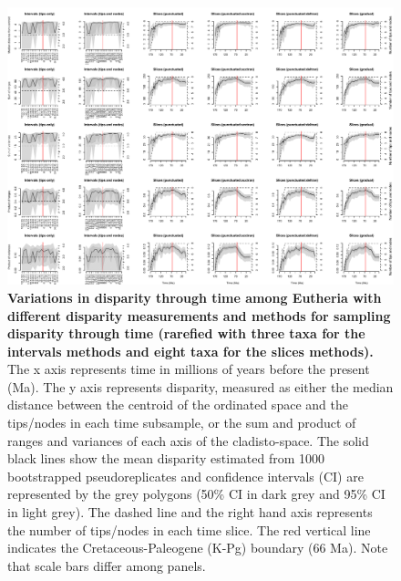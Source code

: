 \begin{landscape}
\begin{figure}[!htbp]
\centering
    \includegraphics[width=\textwidth,height=\textheight,keepaspectratio]{Supplementaries/Figures/STD/Eutheria_all_methods_rarefied.pdf}
\caption[Comparison of all the disparity metrics and all the time sampling methods for Eutheria (rarefied)]{\textbf{Variations in disparity through time among Eutheria  with different disparity measurements and methods for sampling disparity through time (rarefied with three taxa for the intervals methods and eight taxa for the slices methods).} The x axis represents time in millions of years before the present (Ma). The y axis represents disparity, measured as either the median distance between the centroid of the ordinated space and the tips/nodes in each time subsample, or the sum and product of ranges and variances of each axis of the cladisto-space. The solid black lines show the mean disparity estimated from 1000 bootstrapped pseudoreplicates and confidence intervals (CI) are represented by the grey polygons (50\% CI in dark grey and 95\% CI in light grey). The dashed line and the right hand axis represents the number of tips/nodes in each time slice. The red vertical line indicates the Cretaceous-Paleogene (K-Pg) boundary (66 Ma). Note that scale bars differ among panels.}
\label{Supp_disparity_all_Eutheria_rarefied}

\end{figure}
\end{landscape}